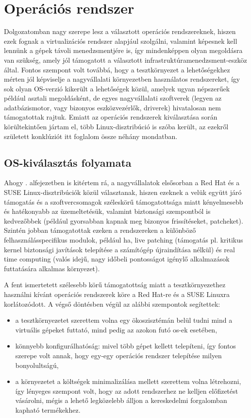 \section{Operációs rendszer}
Dolgozatomban nagy szerepe lesz a választott operációs rendszereknek, hiszen ezek fognak a virtualizációs rendszer alapjául szolgálni, valamint képesnek kell lennünk a gépek távoli menedzsmentjére is, így mindenképpen olyan megoldásra van szükség, amely jól támogatott a választott infrastruktúramenedzsment-eszköz által. Fontos szempont volt továbbá, hogy a tesztkörnyezet a lehetőségekhez mérten jól képviselje a nagyvállalati környezetben használatos rendszereket, így sok olyan OS-verzió kikerült a lehetőségek közül, amelyek ugyan népszerűek például asztali megoldásként, de egyes nagyvállalati szoftverek (legyen az adatbázismotor, vagy bizonyos eszközvezérlők, driverek) hivatalosan nem támogatottak rajtuk. Emiatt az operációs rendszerek kiválasztása során körültekintően jártam el, több Linux-disztribúció is szóba került, az ezekről született konklúziót itt foglalom össze néhány mondatban.

\subsection{OS-kiválasztás folyamata}
Ahogy . alfejezetben is kitértem rá, a nagyvállalatok elsősorban a Red Hat és a SUSE Linux-disztribúciók közül választanak, hiszen ezeknek a velük együtt járó támogatás és a szoftvercsomagok széleskörű támogatottsága miatt kényelmesebb és hatékonyabb az üzemeltetésük, valamint biztonsági szempontból is kedvezőbbek (például gyorsabban kapnak meg bizonyos frissítéseket, patcheket). Szintén jobban támogatottak ezeken a rendszereken a különböző felhasználásspecifikus modulok, például \acrfull{ha}, live patching (támogatás pl. kritikus kernel biztonsági javítások telepítése a számítógép újraindítása nélkül) és real time computing (valós idejű, nagy időbeli pontosságot igénylő alkalmazások futtatására alkalmas környezet).

A fent ismertetett szélesebb körű támogatottság miatt a tesztkörnyezethez használni kívánt operációs rendszerek köre a Red Hat-re és a SUSE Linuxra korlátozódott. A végső döntésben végül az alábbi szempontok segítettek:
\begin{itemize}
	\item a tesztkörnyezetet szerettem volna egy ökoszisztémán belül tudni mind a virtuális gépeket futtató, mind pedig az azokon futó \acrshort{os}-ek esetében,
	\item könnyebb konfigurálhatóság: mivel több gépet kellett telepíteni, így fontos szerepe volt annak, hogy egy-egy operációs rendszer telepítése milyen bonyolultságú,
	\item a környezetet a költségek minimalizálása mellett szerettem volna létrehozni, így lényeges szempont volt, hogy az adott rendszerhez ne kelljen előfizetést vásárolni, mégis a lehető legközelebb álljon a kereskedelmi forgalomban kapható termékekhez.
\end{itemize}

